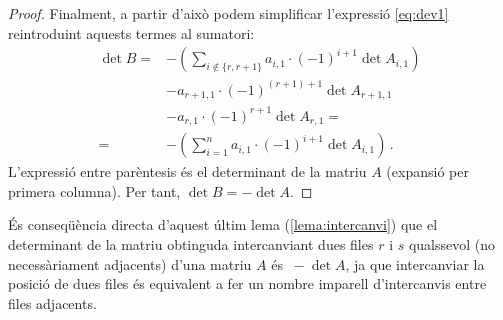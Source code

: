 \begin{lema}
\begin{proof}
		Finalment, a partir d'això podem simplificar l'expressió \eqref{eq:dev1} reintroduint aquests termes al sumatori:
		\begin{equation}\label{eq:development}
			\begin{split}
				\det B =& 	-\left(\sum_{i\notin \{r, r+1\}} a_{i,1}\cdot(-1)^{i+1}\det A_{i,1}\right)\\
				&	-a_{r+1,1}\cdot(-1)^{(r+1)+1}\det A_{r+1,1}\\
				&	-a_{r,1}\cdot(-1)^{r+1}\det A_{r,1} = \\
				=&-\left(\sum_{i=1}^{n} a_{i,1}\cdot(-1)^{i+1}\det A_{i,1}\right)\,.
			\end{split}
		\end{equation}
		L'expressió entre parèntesis és el determinant de la matriu $A$ (expansió per primera columna). Per tant, $\det B = -\det A$.
	\end{proof}
	
	\begin{col} \label{col:intercanvi}
		És conseqüència directa d'aquest últim lema (\ref{lema:intercanvi}) que el determinant de la matriu obtinguda intercanviant dues files $r$ i $s$ qualssevol (no necessàriament adjacents) d'una matriu $A$ és $\ -\det A$, ja que intercanviar la posició de dues files és equivalent a fer un nombre imparell d'intercanvis entre files adjacents.
		

\end{col}
\end{lema}
